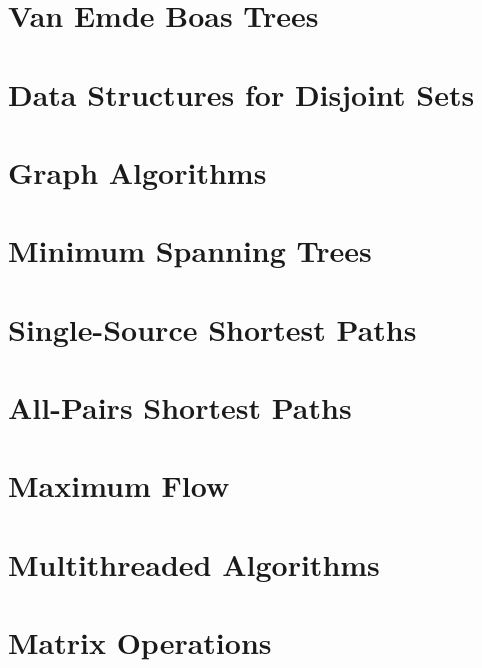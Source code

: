 \documentclass{book}
\begin{document}
\chapter{Van Emde Boas Trees}




\chapter{Data Structures for Disjoint Sets}




\chapter{Graph Algorithms}




\chapter{Minimum Spanning Trees}





\chapter{Single-Source Shortest Paths}





\chapter{All-Pairs Shortest Paths}




\chapter{Maximum Flow}




\chapter{Multithreaded Algorithms}




\chapter{Matrix Operations}
\end{document}
